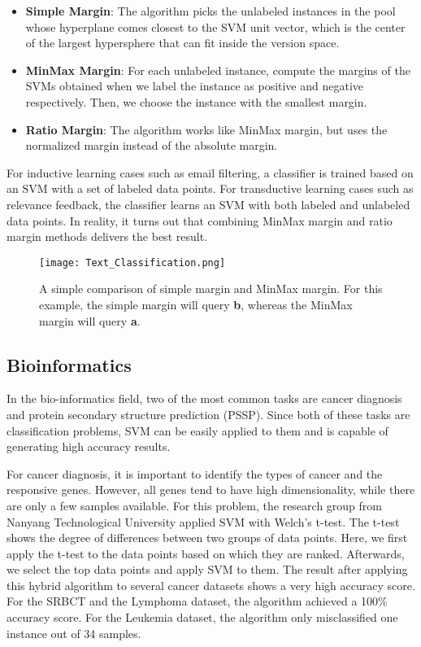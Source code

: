\begin{itemize}
    \item \textbf{Simple Margin}: The algorithm picks the unlabeled instances
    in the pool whose hyperplane comes closest to the SVM unit vector, which is
    the center of the largest hypersphere that can fit inside the version space.
    \item \textbf{MinMax Margin}: For each unlabeled instance, compute the margins
    of the SVMs obtained when we label the instance as positive and negative
    respectively. Then, we choose the instance with the smallest margin.
    \item \textbf{Ratio Margin}: The algorithm works like MinMax margin, but uses
    the normalized margin instead of the absolute margin.
\end{itemize}

For inductive learning cases such as email filtering, a classifier is trained 
based on an SVM with a set of labeled data points.
For transductive learning cases such as relevance feedback, the classifier
learns an SVM with both labeled and unlabeled data points. In reality, it turns
out that combining MinMax margin and ratio margin methods delivers the best
result. \cite{text-classification}
\begin{figure}[h]%
    \begin{center}%
        \texttt{[image: Text\_Classification.png]}%
        \caption{
        A simple comparison of simple margin and MinMax margin.
        For this example, the simple margin will query \textbf{b},
        whereas the MinMax margin will query \textbf{a}.
        \cite{text-classification}}\label{fig:}%
    \end{center}%
\end{figure}


\subsection*{Bioinformatics}
In the bio-informatics field, two of the most common tasks are cancer
diagnosis and protein secondary structure prediction (PSSP). Since both of these
tasks are classification problems, SVM can be easily applied to them and is
capable of generating high accuracy results.

For cancer diagnosis, it is important to identify the types of cancer and the
responsive genes. However, all genes tend to have high dimensionality, while 
there are only a few samples available. For this problem, the research group
from Nanyang Technological University applied SVM with Welch's t-test.
The t-test shows the degree of differences between two groups of data points.
Here, we first apply the t-test to the data points based on which they are 
ranked. Afterwards, we select the top data points and apply SVM to them.
The result after applying this hybrid algorithm to several cancer datasets 
shows a very high accuracy score. For the SRBCT and the Lymphoma dataset, the
algorithm achieved a 100\% accuracy score. For the Leukemia dataset, the
algorithm only misclassified one instance out of 34 samples.

